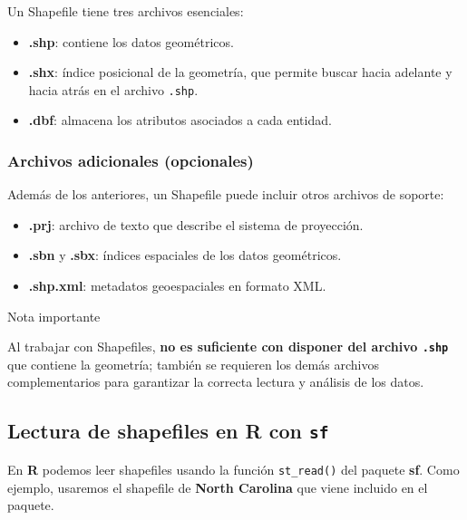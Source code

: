 \documentclass[
]{book}
\providecommand{\tightlist}{%
  \setlength{\itemsep}{0pt}\setlength{\parskip}{0pt}}
\begin{document}
Un Shapefile tiene tres archivos esenciales:

\begin{itemize}
\tightlist
\item
  \textbf{.shp}: contiene los datos geométricos.\\
\item
  \textbf{.shx}: índice posicional de la geometría, que permite buscar hacia adelante y hacia atrás en el archivo \texttt{.shp}.\\
\item
  \textbf{.dbf}: almacena los atributos asociados a cada entidad.
\end{itemize}

\subsubsection{Archivos adicionales (opcionales)}\label{archivos-adicionales-opcionales}

Además de los anteriores, un Shapefile puede incluir otros archivos de soporte:

\begin{itemize}
\tightlist
\item
  \textbf{.prj}: archivo de texto que describe el sistema de proyección.\\
\item
  \textbf{.sbn} y \textbf{.sbx}: índices espaciales de los datos geométricos.\\
\item
  \textbf{.shp.xml}: metadatos geoespaciales en formato XML.
\end{itemize}

{} Nota importante

Al trabajar con Shapefiles, \textbf{no es suficiente con disponer del archivo \texttt{.shp}} que contiene la geometría; también se requieren los demás archivos complementarios para garantizar la correcta lectura y análisis de los datos.

\subsection{\texorpdfstring{Lectura de shapefiles en \textbf{R} con \texttt{sf}}{Lectura de shapefiles en R con sf}}\label{lectura-de-shapefiles-en-r-con-sf}

En \textbf{R} podemos leer shapefiles usando la función \texttt{st\_read()} del paquete \textbf{sf}. Como ejemplo, usaremos el shapefile de \textbf{North Carolina} que viene incluido en el paquete.
\end{document}
